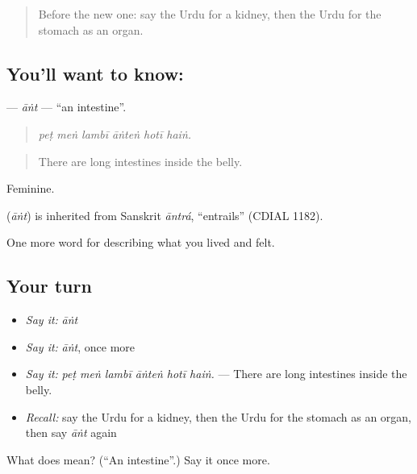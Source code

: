 \begin{quote}
Before the new one: say the Urdu for a kidney, then the Urdu for the stomach as an organ.
\end{quote}

\subsection*{You'll want to know: }
\textbf{} — \emph{āṅt} — \textquotedblleft{}an intestine\textquotedblright{}.

\begin{quote}
     
\end{quote}

\begin{quote}
\emph{peṭ meṅ lambī āṅteṅ hotī haiṅ.}
\end{quote}

\begin{quote}
There are long intestines inside the belly.
\end{quote}

Feminine.

\begin{cousinweb}
\textbf{} (\emph{āṅt}) is inherited from Sanskrit \emph{āntrá}, \textquotedblleft{}entrails\textquotedblright{} (CDIAL 1182).
\end{cousinweb}

\begin{grammarlens}[title={What you've built}]
One more word for describing what you lived and felt.
\end{grammarlens}

\subsection*{Your turn}
\begin{itemize}
\raggedright
  \item \emph{Say it:} \emph{āṅt}
  \item \emph{Say it:} \emph{āṅt}, once more
  \item \emph{Say it:} \emph{peṭ meṅ lambī āṅteṅ hotī haiṅ.} — There are long intestines inside the belly.
  \item \emph{Recall:} say the Urdu for a kidney, then the Urdu for the stomach as an organ, then say \emph{āṅt} again
\end{itemize}

\begin{tcolorbox}[breakable,colback=teal!4,colframe=teal!35!black,title={Before you move on}]
What does  mean? (\textquotedblleft{}An intestine\textquotedblright{}.) Say it once more.
\end{tcolorbox}
